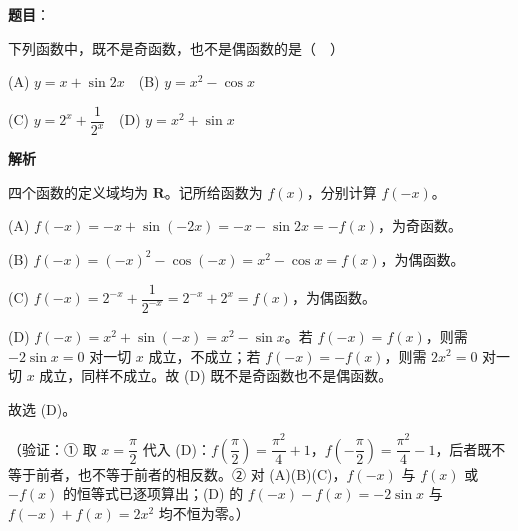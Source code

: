 \begin{answer}

\textbf{题目}：

下列函数中，既不是奇函数，也不是偶函数的是（　）

(A) \(y=x+\sin 2x\)　(B) \(y=x^2-\cos x\)

(C) \(y=2^x+\dfrac{1}{2^x}\)　(D) \(y=x^2+\sin x\)

\textbf{解析}

四个函数的定义域均为 \(\mathbf{R}\)。记所给函数为 \(f(x)\)，分别计算 \(f(-x)\)。

(A) \(f(-x)=-x+\sin(-2x)=-x-\sin 2x=-f(x)\)，为奇函数。

(B) \(f(-x)=(-x)^2-\cos(-x)=x^2-\cos x=f(x)\)，为偶函数。

(C) \(f(-x)=2^{-x}+\dfrac{1}{2^{-x}}=2^{-x}+2^{x}=f(x)\)，为偶函数。

(D) \(f(-x)=x^2+\sin(-x)=x^2-\sin x\)。若 \(f(-x)=f(x)\)，则需 \(-2\sin x=0\) 对一切 \(x\) 成立，不成立；若 \(f(-x)=-f(x)\)，则需 \(2x^2=0\) 对一切 \(x\) 成立，同样不成立。故 (D) 既不是奇函数也不是偶函数。

故选 (D)。

（验证：① 取 \(x=\dfrac{\pi}{2}\) 代入 (D)：\(f\left(\dfrac{\pi}{2}\right)=\dfrac{\pi^2}{4}+1\)，\(f\left(-\dfrac{\pi}{2}\right)=\dfrac{\pi^2}{4}-1\)，后者既不等于前者，也不等于前者的相反数。② 对 (A)(B)(C)，\(f(-x)\) 与 \(f(x)\) 或 \(-f(x)\) 的恒等式已逐项算出；(D) 的 \(f(-x)-f(x)=-2\sin x\) 与 \(f(-x)+f(x)=2x^2\) 均不恒为零。）


\end{answer}
